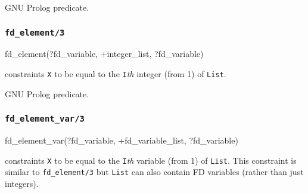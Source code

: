 \Portability

GNU Prolog predicate.

\subsubsection{\texttt{fd\_element/3}}
\label{fd-element/3}

\begin{TemplatesOneCol}
fd\_element(?fd\_variable, +integer\_list, ?fd\_variable)

\end{TemplatesOneCol}

\Description

 constraints \texttt{X} to be equal to the
\texttt{I}\emph{th} integer (from 1) of \texttt{List}.

\begin{PlErrors}






\end{PlErrors}

\Portability

GNU Prolog predicate.

\subsubsection{\texttt{fd\_element\_var/3}}

\begin{TemplatesOneCol}
fd\_element\_var(?fd\_variable, +fd\_variable\_list, ?fd\_variable)

\end{TemplatesOneCol}

\Description

 constraints \texttt{X} to be equal to
the \texttt{I}\emph{th} variable (from 1) of \texttt{List}. This
constraint is similar to \texttt{fd\_element/3}  but
\texttt{List} can also contain FD variables (rather than just integers).

